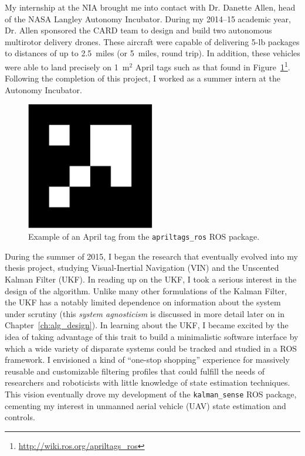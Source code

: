 My internship at the NIA brought me into contact with Dr. Danette Allen, head of the NASA Langley Autonomy Incubator. During my 2014--15 academic year, Dr. Allen sponsored the CARD team to design and build two autonomous multirotor delivery drones. These aircraft were capable of delivering 5-lb packages to distances of up to 2.5~miles (or 5~miles, round trip). In addition, these vehicles were able to land precisely on 1~m$^2$ April tags such as that found in Figure~\ref{fig:april_tag}\footnote{\url{http://wiki.ros.org/apriltags\_ros}}. Following the completion of this project, I worked as a summer intern at the Autonomy Incubator.

\begin{figure}
  \centering
    \includegraphics[width=0.5\textwidth]{april_tag}
  \caption[Example April tag]{Example of an April tag from the \texttt{apriltags\_ros} ROS package.}
  \label{fig:april_tag}
\end{figure}

During the summer of 2015, I began the research that eventually evolved into my thesis project, studying Visual-Inertial Navigation (VIN) and the Unscented Kalman Filter (UKF). In reading up on the UKF, I took a serious interest in the design of the algorithm. Unlike many other formulations of the Kalman Filter, the UKF has a notably limited dependence on information about the system under scrutiny (this \textit{system agnosticism} is discussed in more detail later on in Chapter~\ref{ch:alg_design}). In learning about the UKF, I became excited by the idea of taking advantage of this trait to build a minimalistic software interface by which a wide variety of disparate systems could be tracked and studied in a ROS framework. I envisioned a kind of ``one-stop shopping'' experience for massively reusable and customizable filtering profiles that could fulfill the needs of researchers and roboticists with little knowledge of state estimation techniques. This vision eventually drove my development of the \texttt{kalman\_sense} ROS package, cementing my interest in unmanned aerial vehicle (UAV) state estimation and controls.

